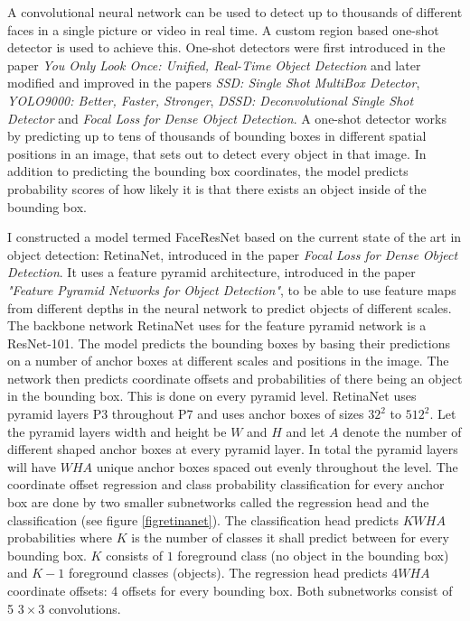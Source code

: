 \documentclass[a4paper,11pt,twoside]{article}
\begin{document}
A convolutional neural network can be used to detect up to thousands of different faces in a single picture or video in real time. A custom region based one-shot detector is used to achieve this. One-shot detectors were first introduced in the paper \textit{You Only Look Once: Unified, Real-Time Object Detection} and later modified and improved in the papers \textit{SSD: Single Shot MultiBox Detector}, \textit{YOLO9000: Better, Faster, Stronger}, \textit{DSSD: Deconvolutional Single Shot Detector} and \textit{Focal Loss for Dense Object Detection}. A one-shot detector works by predicting up to tens of thousands of bounding boxes in different spatial positions in an image, that sets out to detect every object in that image. In addition to predicting the bounding box coordinates, the model predicts probability scores of how likely it is that there exists an object inside of the bounding box. \cite{yolo} \cite{ssd} \cite{yolo9000} \cite{dssd} \cite{retinanet}

I constructed a model termed FaceResNet based on the current state of the art in object detection: RetinaNet, introduced in the paper \textit{Focal Loss for Dense Object Detection}. It uses a feature pyramid architecture, introduced in the paper \textit{"Feature Pyramid Networks for Object Detection"}, to be able to use feature maps from different depths in the neural network to predict objects of different scales. The backbone network RetinaNet uses for the feature pyramid network is a ResNet-101. The model predicts the bounding boxes by basing their predictions on a number of anchor boxes at different scales and positions in the image. The network then predicts coordinate offsets and probabilities of there being an object in the bounding box. This is done on every pyramid level. RetinaNet uses pyramid layers P3 throughout P7 and uses anchor boxes of sizes $32^2$ to $512^2$. Let the pyramid layers width and height be $W$ and $H$ and let $A$ denote the number of different shaped anchor boxes at every pyramid layer. In total the pyramid layers will have $WHA$ unique anchor boxes spaced out evenly throughout the level. The coordinate offset regression and class probability classification for every anchor box are done by two smaller subnetworks called the regression head and the classification (see figure \ref{figretinanet}). The classification head predicts $KWHA$ probabilities where $K$ is the number of classes it shall predict between for every bounding box. $K$ consists of $1$ foreground class (no object in the bounding box) and $K-1$ foreground classes (objects). The regression head predicts $4WHA$ coordinate offsets: 4 offsets for every bounding box. Both subnetworks consist of 5 $3 \times 3$ convolutions. \cite{retinanet} \cite{fpn}
\end{document}
